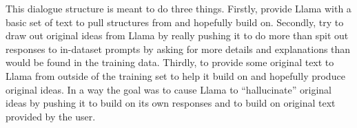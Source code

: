 This dialogue structure is meant to do three things. Firstly, provide Llama with
a basic set of text to pull structures from and hopefully build on. Secondly,
try to draw out original ideas from Llama by really pushing it to do more than 
spit out responses to in-dataset prompts by asking for more details and
explanations than would be found in the training data. Thirdly, to provide some
original text to Llama from outside of the training set to help it build on and
hopefully produce original ideas. In a way the goal was to cause Llama to 
``hallucinate'' original ideas by pushing it to build on its own responses and
to build on original text provided by the user.

